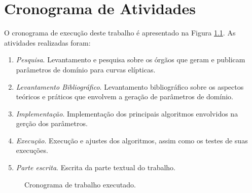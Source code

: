\chapter{Cronograma de Atividades}

O cronograma de execução deste trabalho é apresentado na Figura \ref{fig:cronograma}. As atividades realizadas foram:

\begin{enumerate}
\item \textit{Pesquisa}. Levantamento e pesquisa sobre os órgãos que geram e publicam parâmetros de domínio para curvas elípticas.
\item \textit{Levantamento Bibliográfico}. Levantamento bibliográfico sobre os aspectos teóricos e práticos que envolvem a geração de parâmetros de domínio.
\item \textit{Implementação}. Implementação dos principais algoritmos envolvidos na gerção dos parâmetros.
\item \textit{Execução}. Execução e ajustes dos algoritmos, assim como os testes de suas execuções.
\item \textit{Parte escrita}. Escrita da parte textual do trabalho.
\end{enumerate}

\begin{figure}[h!]
\begin{center}
\end{center}
\caption{Cronograma de trabalho executado.}
\label{fig:cronograma}
\end{figure}
